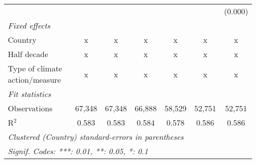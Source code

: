 \begin{tabular}{lcccccc}
                                                  &         &                &                &                &                & (0.000)\\   
   \emph{Fixed effects}\\
   Country                                        & x       & x              & x              & x              & x              & x\\  
   Half decade                                    & x       & x              & x              & x              & x              & x\\  
   Type of climate action/measure                 & x       & x              & x              & x              & x              & x\\  
   \midrule \emph{Fit statistics}\\
   Observations                                   & 67,348  & 67,348         & 66,888         & 58,529         & 52,751         & 52,751\\  
   R$^2$                                          & 0.583   & 0.583          & 0.584          & 0.578          & 0.586          & 0.586\\  
   \midrule
   \multicolumn{7}{l}{\emph{Clustered (Country) standard-errors in parentheses}}\\
   \multicolumn{7}{l}{\emph{Signif. Codes: ***: 0.01, **: 0.05, *: 0.1}}\\
\end{tabular}
\par\endgroup



